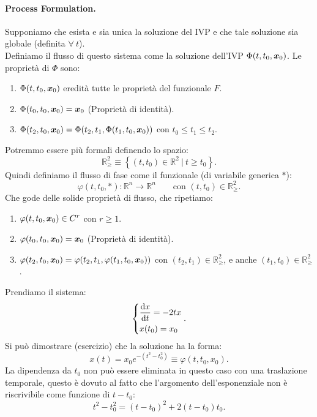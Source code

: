 \paragraph{Process Formulation.}%
\label{par:Process Formulation.}
Supponiamo che esista e sia unica la soluzione del IVP e che tale soluzione sia globale (definita $\forall \ t$).\\
Definiamo il flusso di questo sistema come la soluzione dell'IVP $\Phi(t, t_0, \boldsymbol{x}_0)$. Le proprietà di $\Phi$  sono:
\begin{enumerate}
    \item $\Phi(t, t_0, \boldsymbol{x}_0)$ eredità tutte le proprietà del funzionale $F$.
    \item $\Phi(t_0, t_0, \boldsymbol{x}_0) = \boldsymbol{x}_0$ (Proprietà di identità).
    \item $\Phi(t_2, t_0, \boldsymbol{x}_0) = \Phi(t_2, t_1, \Phi(t_1, t_0, \boldsymbol{x}_0))$ con $t_0 \le t_1\le t_2$.
\end{enumerate}
Potremmo essere più formali definendo lo spazio:
\[
    \mathbb{R}^2_{\ge } \equiv \left\{ (t, t_0) \in \mathbb{R}^2 \ | \ t \ge t_0\right\}
.\] 
Quindi definiamo il flusso di fase come il funzionale (di variabile generica $*$):
\[
    \varphi (t,t_0,*):\mathbb{R}^n\to \mathbb{R}^n \qquad \text{con } (t, t_0) \in \mathbb{R}^2_{\ge }
.\] 
Che gode delle solide proprietà di flusso, che ripetiamo:
\begin{enumerate}
    \item $\varphi(t, t_0, \boldsymbol{x}_0) \in C^r$ con $r\ge 1$.
    \item $\varphi(t_0, t_0, \boldsymbol{x}_0) = \boldsymbol{x}_0$ (Proprietà di identità).
    \item $\varphi(t_2, t_0, \boldsymbol{x}_0) = \varphi(t_2, t_1, \varphi(t_1, t_0, \boldsymbol{x}_0))$ con $(t_2, t_1) \in \mathbb{R}^2_{\ge }$, e anche $(t_1, t_0) \in \mathbb{R}^2_{\ge }$ .
\end{enumerate}
\begin{exmp}
    Prendiamo il sistema:
    \[
        \begin{dcases}
	    \frac{\text{d} x}{\text{d} t} = -2tx\\
	    x(t_0) = x_0
        \end{dcases}
    .\] 
    Si può dimostrare (esercizio) che la soluzione ha la forma:
    \[
	x(t)=x_0e^{-(t^2-t_0^2)} \equiv \varphi (t, t_0, x_0)
    .\] 
    La dipendenza da $t_0$ non può essere eliminata in questo caso con una traslazione temporale, questo è dovuto al fatto che l'argomento dell'esponenziale non è riscrivibile come funzione di $t-t_0$:
    \[
	t^2-t_0^2 = \left(t-t_0\right)^2 + 2(t-t_0)t_0
    .\] 
\end{exmp}
\noindent
